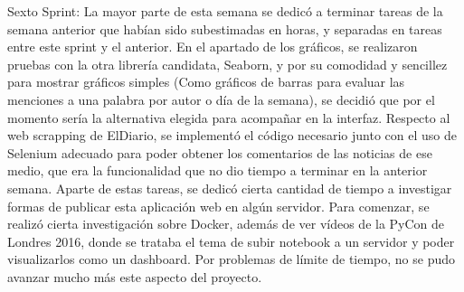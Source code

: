 Sexto Sprint:
La mayor parte de esta semana se dedicó a terminar tareas de la semana anterior que habían sido subestimadas en horas, y separadas en tareas entre este sprint y el anterior.
En el apartado de los gráficos, se realizaron pruebas con la otra librería candidata, Seaborn, y por su comodidad y sencillez para mostrar gráficos simples (Como gráficos de barras para evaluar las menciones a una palabra por autor o día de la semana), se decidió que por el momento sería la alternativa elegida para acompañar en la interfaz.
Respecto al web scrapping de ElDiario, se implementó el código necesario junto con el uso de Selenium adecuado para poder obtener los comentarios de las noticias de ese medio, que era la funcionalidad que no dio tiempo a terminar en la anterior semana.
Aparte de estas tareas, se dedicó cierta cantidad de tiempo a investigar formas de publicar esta aplicación web en algún servidor. Para comenzar, se realizó cierta investigación sobre Docker, además de ver vídeos de la PyCon de Londres 2016, donde se trataba el tema de subir notebook a un servidor y poder visualizarlos como un dashboard. Por problemas de límite de tiempo, no se pudo avanzar mucho más este aspecto del proyecto.


